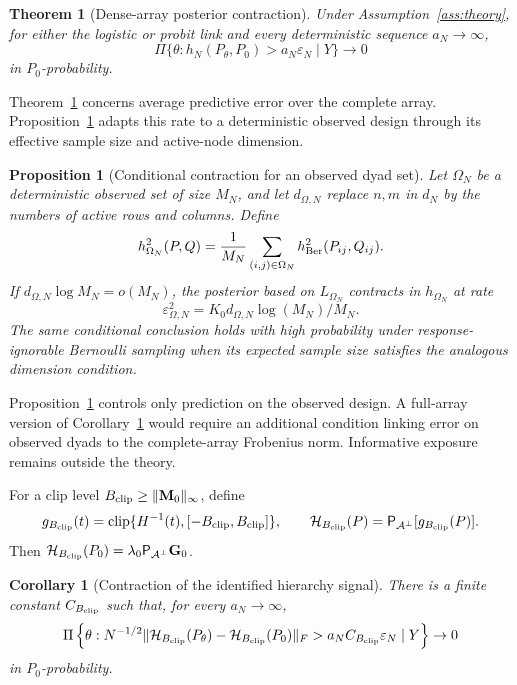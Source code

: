 \documentclass[
  12pt]{article}
\newtheorem{theorem}{Theorem}[section]
\newtheorem{proposition}{Proposition}[section]
\newtheorem{corollary}{Corollary}[section]
\theoremstyle{definition}
\theoremstyle{plain}
\newcommand{\calA}{\mathcal A}
\newcommand{\projA}{\mathsf P_{\calA^\perp}}
\newcommand{\bG}{\mathbf G}
\newcommand{\bM}{\mathbf M}
\newcommand{\eps}{\varepsilon}
\DeclareMathOperator{\clip}{clip}
\begin{document}
\begin{theorem}[Dense-array posterior contraction]
\label{thm:contraction}
Under Assumption~\ref{ass:theory}, for either the logistic or probit link and every deterministic sequence $a_N\to\infty$,
\[
\Pi\{\theta:h_N(P_\theta,P_0)>a_N\eps_N\mid Y\}\to0
\]
in $P_0$-probability.
\end{theorem}

Theorem~\ref{thm:contraction} concerns average predictive error over the complete array. Proposition~\ref{prop:observed} adapts this rate to a deterministic observed design through its effective sample size and active-node dimension.

\begin{proposition}[Conditional contraction for an observed dyad set]
\label{prop:observed}
Let $\Omega_N$ be a deterministic observed set of size $M_N$, and let $d_{\Omega,N}$ replace $n,m$ in $d_N$ by the numbers of active rows and columns. Define
\[
h_{\Omega_N}^2(P,Q)=\frac1{M_N}\sum_{(i,j)\in\Omega_N}h_{\rm Ber}^2(P_{ij},Q_{ij}).
\]
If $d_{\Omega,N}\log M_N=o(M_N)$, the posterior based on $L_{\Omega_N}$ contracts in $h_{\Omega_N}$ at rate
\[
\eps_{\Omega,N}^2=K_0d_{\Omega,N}\log(M_N)/M_N.
\]
The same conditional conclusion holds with high probability under response-ignorable Bernoulli sampling when its expected sample size satisfies the analogous dimension condition.
\end{proposition}


Proposition~\ref{prop:observed} controls only prediction on the observed design. A full-array version of Corollary~\ref{cor:signal} would require an additional condition linking error on observed dyads to the complete-array Frobenius norm. Informative exposure remains outside the theory.

For a clip level $B_{\rm clip}\ge\|\bM_0\|_\infty$, define
\[
g_{B_{\rm clip}}(t)=\clip\{H^{-1}(t),[-B_{\rm clip},B_{\rm clip}]\},
\qquad
\mathcal H_{B_{\rm clip}}(P)=\projA[g_{B_{\rm clip}}(P)].
\]
Then $\mathcal H_{B_{\rm clip}}(P_0)=\lambda_0\projA\bG_0$.

\begin{corollary}[Contraction of the identified hierarchy signal]
\label{cor:signal}
There is a finite constant $C_{B_{\rm clip}}$ such that, for every $a_N\to\infty$,
\[
\Pi\left\{\theta:
N^{-1/2}\|\mathcal H_{B_{\rm clip}}(P_\theta)-\mathcal H_{B_{\rm clip}}(P_0)\|_F
>a_N C_{B_{\rm clip}}\eps_N\mid Y\right\}\to0
\]
in $P_0$-probability.
\end{corollary}
\end{document}
